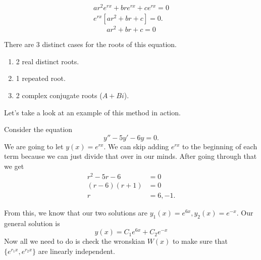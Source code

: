   \begin{align*}
    ar^2e^{rx}+bre^{rx}+ce^{rx}=0\\
    e^{rx}[ar^2+br+c]=0
  .\end{align*}
  \[
    \boxed{ar^2+br+c=0}
  \]
  
  There are 3 distinct cases for the roots of this equation.
  \begin{enumerate}
    \item 2 real distinct roots.
    \item 1 repeated root.
    \item 2 complex conjugate roots ($A+Bi$).
  \end{enumerate}

  Let's take a look at an example of this method in action.

  \begin{eg}
    Consider the equation 
    \[
    y''-5y'-6y=0
    .\] 
    We are going to let $y(x)=e^{rx}$. We can skip adding $e^{rx}$ to the beginning of each term because we can just divide that over in our minds. After going through that we get 
    \begin{align*}
      r^2-5r-6&=0\\
      (r-6)(r+1)&=0\\
      r&=6,-1
    .\end{align*}
    
    From this, we know that our two solutions are $y_1(x)=e^{6x},y_2(x)=e^{-x}$. Our general solution is 
    \[
      \boxed{y(x)=C_1 e^{6x}+C_2e^{-x}}
    \]
    Now all we need to do is check the wronskian $W(x)$ to make sure that $\{e^{r_1x},e^{r_2x}\}$ are linearly independent.
  \end{eg}

